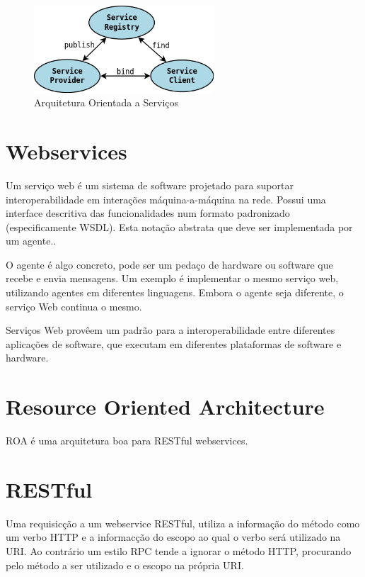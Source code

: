 \begin{figure}[h]
   \label{soaOverview}
   \centering
   \includegraphics[width=0.6\textwidth]{figuras/soa.png}
   \caption{Arquitetura Orientada a Servi\c{c}os}
\end{figure}


\section{Webservices}

Um servi\c{c}o web \'e um sistema de software projetado para suportar interoperabilidade em intera\c{c}\~oes m\'aquina-a-m\'aquina na rede. Possui uma interface descritiva das funcionalidades num formato padronizado (especificamente WSDL). Esta nota\c{c}\~ao abstrata que deve ser implementada por um agente.\cite{w3c-web-04}. 

O agente \'e algo concreto, pode ser um peda\c{c}o de hardware ou software que recebe e envia mensagens. Um exemplo \'e implementar o mesmo servi\c{c}o web, utilizando agentes em diferentes linguagens. Embora o agente seja diferente, o servi\c{c}o Web continua o mesmo.

Servi\c{c}os Web prov\^eem um padr\~ao para a interoperabilidade entre diferentes aplica\c{c}\~oes de software, que executam em diferentes plataformas de software e hardware.


\section{Resource Oriented Architecture}

ROA \'e uma arquitetura boa para RESTful webservices. \cite{richardson2008restful}

\section{RESTful}

Uma requisic\c{c}\~ao a um webservice RESTful, utiliza a informa\c{c}\~ao do m\'etodo como um verbo HTTP e a informac\c{c}\~ao do escopo ao qual o verbo ser\'a utilizado na URI. Ao contr\'ario um estilo RPC tende a ignorar o m\'etodo HTTP, procurando pelo m\'etodo a ser utilizado e o escopo na pr\'opria URI.

